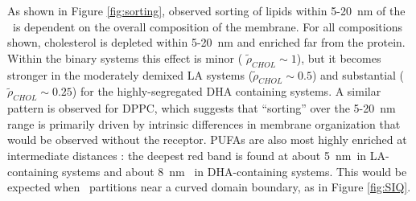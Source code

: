 	As shown in Figure \ref{fig:sorting}, observed sorting of lipids within {5-20~nm} of the \nachr~is dependent on the overall composition of the membrane. For all compositions shown, cholesterol is depleted within 5-20~nm and enriched far from the protein.  Within the binary systems this effect is minor ( $\tilde\rho_{CHOL} \sim 1$), but it becomes stronger in the moderately demixed LA systems ($\tilde\rho_{CHOL} \sim 0.5$) and substantial ($\tilde\rho_{CHOL} \sim 0.25$) for the highly-segregated DHA containing systems.  A similar pattern is observed for DPPC, which suggests that ``sorting'' over the 5-20~nm range is primarily driven by intrinsic differences in membrane organization that would be observed without the receptor. PUFAs are also most highly enriched at intermediate distances : the deepest red band is found at about 5~nm~in LA-containing systems and about 8~nm~ in DHA-containing systems.  This would be expected when \nachr~partitions near a curved domain boundary, as in Figure \ref{fig:SIQ}.      			




